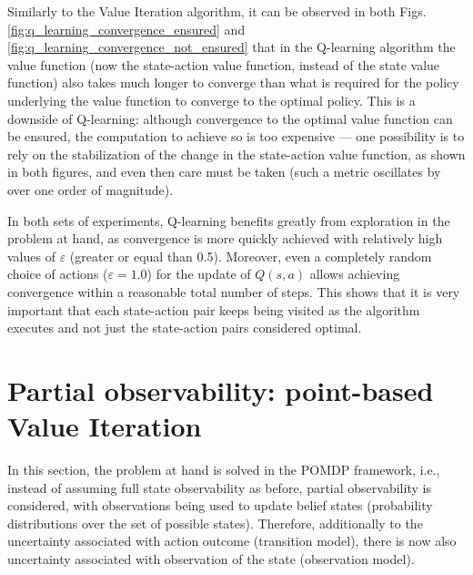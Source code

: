 \documentclass[a4paper]{article}
\begin{document}
Similarly to the Value Iteration algorithm, it can be observed in both Figs. \ref{fig:q_learning_convergence_ensured} and \ref{fig:q_learning_convergence_not_ensured} that in the Q-learning algorithm the value function (now the state-action value function, instead of the state value function) also takes much longer to converge than what is required for the policy underlying the value function to converge to the optimal policy. This is a downside of Q-learning: although convergence to the optimal value function can be ensured, the computation to achieve so is too expensive --- one possibility is to rely on the stabilization of the change in the state-action value function, as shown in both figures, and even then care must be taken (such a metric oscillates by over one order of magnitude).



In both sets of experiments, Q-learning benefits greatly from exploration in the problem at hand, as convergence is more quickly achieved with relatively high values of $\varepsilon$ (greater or equal than 0.5). Moreover, even a completely random choice of actions ($\varepsilon=1.0$) for the update of $Q(s,a)$ allows achieving convergence within a reasonable total number of steps. This shows that it is very important that each state-action pair keeps being visited as the algorithm executes and not just the state-action pairs considered optimal.


\section{Partial observability: point-based Value Iteration}

In this section, the problem at hand is solved in the POMDP framework, i.e., instead of assuming full state observability as before, partial observability is considered, with observations being used to update belief states (probability distributions over the set of possible states). Therefore, additionally to the uncertainty associated with action outcome (transition model), there is now also uncertainty associated with observation of the state (observation model).
\end{document}
